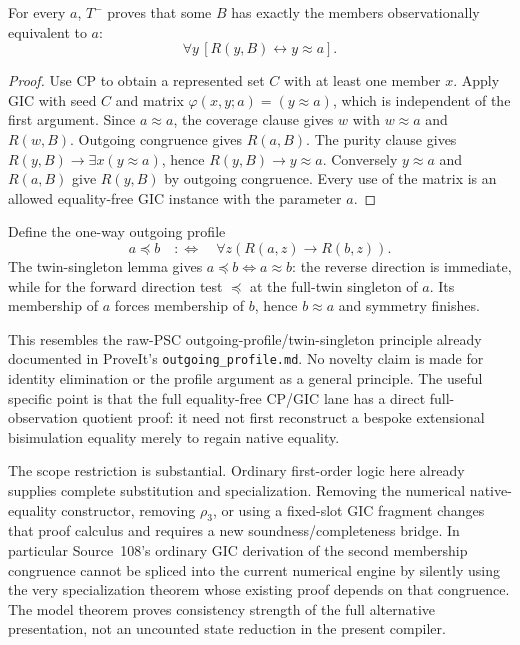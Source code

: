 \begin{lemma}
For every $a$, $T^-$ proves that some $B$ has exactly the members
observationally equivalent to $a$:
\[
 \forall y\,[R(y,B)\leftrightarrow y\approx a].
\]
\end{lemma}
\begin{proof}
Use CP to obtain a represented set $C$ with at least one member $x$.
Apply GIC with seed $C$ and matrix $\varphi(x,y;a)=(y\approx a)$,
which is independent of the first argument. Since $a\approx a$, the
coverage clause gives $w$ with $w\approx a$ and $R(w,B)$. Outgoing
congruence gives $R(a,B)$. The purity clause gives
$R(y,B)\to\exists x(y\approx a)$, hence $R(y,B)\to y\approx a$.
Conversely $y\approx a$ and $R(a,B)$ give $R(y,B)$ by outgoing
congruence. Every use of the matrix is an allowed equality-free GIC
instance with the parameter $a$.
\end{proof}

Define the one-way outgoing profile
\[
 a\preceq b\quad:\Longleftrightarrow\quad
 \forall z(R(a,z)\to R(b,z)).
\]
The twin-singleton lemma gives $a\preceq b\Longleftrightarrow a\approx b$:
the reverse direction is immediate, while for the forward direction
test $\preceq$ at the full-twin singleton of $a$. Its membership of $a$
forces membership of $b$, hence $b\approx a$ and symmetry finishes.

This resembles the raw-PSC outgoing-profile/twin-singleton principle
already documented in ProveIt's \texttt{outgoing\_profile.md}. No novelty
claim is made for identity elimination or the profile argument as a
general principle. The useful specific point is that the full
equality-free CP/GIC lane has a direct full-observation quotient proof:
it need not first reconstruct a bespoke extensional bisimulation
equality merely to regain native equality.

The scope restriction is substantial. Ordinary first-order logic here
already supplies complete substitution and specialization. Removing
the numerical native-equality constructor, removing $\rho_3$, or using
a fixed-slot GIC fragment changes that proof calculus and requires a
new soundness/completeness bridge. In particular Source~108's ordinary
GIC derivation of the second membership congruence cannot be spliced
into the current numerical engine by silently using the very
specialization theorem whose existing proof depends on that congruence.
The model theorem proves consistency strength of the full alternative
presentation, not an uncounted state reduction in the present compiler.


